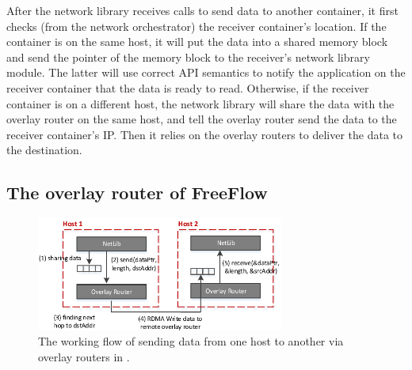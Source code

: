 
After the network library receives calls to send data to another container, it
first checks (from the network orchestrator) the receiver container's location. If
the container is on the same host, it will put the data into a shared memory
block and send the pointer of the memory block to the receiver's network library
module. The latter will use correct API semantics to notify the application on
the receiver container that the data is ready to read.  Otherwise, if the receiver
container is on a different host, the network library will share the data with
the overlay router on the same host, and tell the overlay router send the data
to the receiver container's IP. Then it relies on the overlay routers to deliver
the data to the destination. 

\subsection{The overlay router of FreeFlow}

\begin{figure}[t!] 
     \centering 
     \includegraphics[width=3.2in]{figures/overlayrouter.pdf} 
    \caption{\label{fig:overlayrouter} The working flow of sending data from one host to another via overlay routers in \sysname.} 
\end{figure} 

